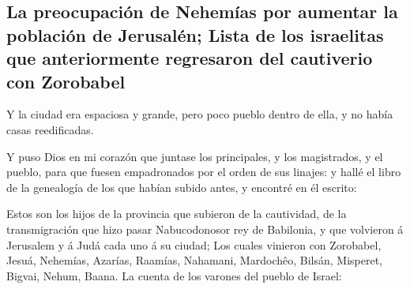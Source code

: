 \hypertarget{la-preocupaciuxf3n-de-nehemuxedas-por-aumentar-la-poblaciuxf3n-de-jerusaluxe9n-lista-de-los-israelitas-que-anteriormente-regresaron-del-cautiverio-con-zorobabel}{%
\subsection{La preocupación de Nehemías por aumentar la población de
Jerusalén; Lista de los israelitas que anteriormente regresaron del
cautiverio con
Zorobabel}\label{la-preocupaciuxf3n-de-nehemuxedas-por-aumentar-la-poblaciuxf3n-de-jerusaluxe9n-lista-de-los-israelitas-que-anteriormente-regresaron-del-cautiverio-con-zorobabel}}

 Y la ciudad era espaciosa y grande, pero poco pueblo
dentro de ella, y no había casas reedificadas.

 Y puso Dios en mi corazón que juntase los principales, y
los magistrados, y el pueblo, para que fuesen empadronados por el orden
de sus linajes: y hallé el libro de la genealogía de los que habían
subido antes, y encontré en él escrito:

 Estos son los hijos de la provincia que subieron de la
cautividad, de la transmigración que hizo pasar Nabucodonosor rey de
Babilonia, y que volvieron á Jerusalem y á Judá cada uno á su ciudad;
 Los cuales vinieron con Zorobabel, Jesuá, Nehemías,
Azarías, Raamías, Nahamani, Mardochêo, Bilsán, Misperet, Bigvai, Nehum,
Baana. La cuenta de los varones del pueblo de Israel:

